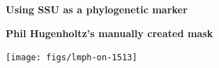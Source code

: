 \documentclass[landscape]{slides}
\begin{document}
\begin{slide}
\begin{center}

\textbf{Using SSU as a phylogenetic marker}
\end{center}

\vfill
\end{slide}
\begin{slide}
\begin{center}

\textbf{Phil Hugenholtz's manually created mask}
\end{center}
\small

\begin{center}
\texttt{[image: figs/lmph-on-1513]}

\end{center}
\vfill
\end{slide}
\end{document}

